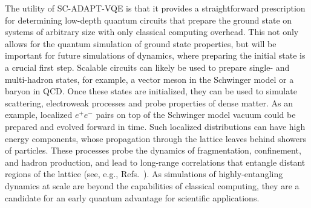 \documentclass[aps, pra, onecolumn, tightenlines, letterpaper, amsmath, amssymb, preprintnumbers, floatfix, longbibliography, nofootinbib]{revtex4-2}
\begin{document}
The utility of SC-ADAPT-VQE is that it provides a straightforward prescription for determining low-depth quantum circuits that prepare the ground state on systems of arbitrary size with only classical computing overhead.
This not only allows for the quantum simulation of ground state properties, but will be important for future simulations of dynamics, where preparing the initial state is a crucial first step.
Scalable circuits can
likely be used to prepare single- and multi-hadron states,
for example, a vector meson in the Schwinger model or a baryon in QCD.
Once these states are initialized, they can be used to simulate scattering, 
electroweak processes
and probe properties of dense matter. 
As an example, localized $e^+e^-$ pairs on top of the Schwinger model vacuum could be prepared and evolved 
forward in time. 
Such localized distributions can have high energy components, 
whose propagation through the lattice 
leaves behind showers of particles.
These processes probe the dynamics of 
fragmentation, confinement, 
and hadron production, and
lead to long-range correlations that entangle distant regions of the lattice (see, e.g., Refs.~\cite{Verdel:2019chj,Milsted:2020jmf,Florio:2023dke,Belyansky:2023rgh}).
As simulations of highly-entangling dynamics at scale are beyond the capabilities of classical computing, they are a candidate for an early quantum advantage for scientific applications.
\end{document}

